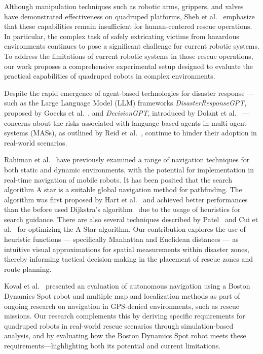 \documentclass[3p,times,procedia]{elsarticle}
\begin{document}
Although manipulation techniques such as robotic arms, grippers, and valves have demonstrated effectiveness on quadruped platforms, Sheh et al.\ \cite{Sheh2016RoboCup} emphasize that these capabilities remain insufficient for human-centered rescue operations. In particular, the complex task of safely extricating victims from hazardous environments continues to pose a significant challenge for current robotic systems. To address the limitations of current robotic systems in those rescue operations, our work proposes a comprehensive experimental setup designed to evaluate the practical capabilities of quadruped robots in complex environments.

Despite the rapid emergence of agent-based technologies for disaster response — such as the Large Language Model (LLM) frameworks \textit{DisasterResponseGPT}, proposed by Goecks et al.\ \cite{goecks2023disasterresponsegpt}, and \textit{DecisionGPT}, introduced by Dolant et al.\ \cite{dolant2025agentic} — concerns about the risks associated with language-based agents in multi-agent systems (MASs), as outlined by Reid et al.\ \cite{reid2025risk}, continue to hinder their adoption in real-world scenarios. 

Rahiman et al.\ \cite{gul2019comprehensive} have previously examined a range of navigation techniques for both static and dynamic environments, with the potential for implementation in real-time navigation of mobile robots. It has been posited that the search algorithm A star is a suitable global navigation method for pathfinding. The algorithm was first proposed by Hart et al.\ \cite{hart1968formal} and achieved better performances than the before used Dijkstra's algorithm\ \cite{Dijkstra1959Note} due to the usage of heuristics for search guidance. There are also several techniques described by Patel\ \cite{Patel2025Variants} and Cui et al.\ \cite{cui2011based} for optimizing the A Star algorithm. Our contribution explores the use of heuristic functions — specifically Manhattan and Euclidean distances — as intuitive visual approximations for spatial measurements within disaster zones, thereby informing tactical decision-making in the placement of rescue zones and route planning.

Koval et al.\ \cite{koval2022navigation} presented an evaluation of autonomous navigation using a Boston Dynamics Spot robot and multiple map and localization methods as part of ongoing research on navigation in GPS-denied environments, such as rescue missions. Our research complements this by deriving specific requirements for quadruped robots in real-world rescue scenarios through simulation-based analysis, and by evaluating how the Boston Dynamics Spot robot meets these requirements—highlighting both its potential and current limitations.
\end{document}
